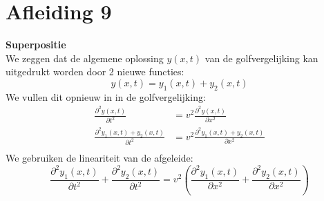 \documentclass[a4paper,kul]{kulakarticle} %
\begin{document}
\section{Afleiding 9}
\textbf{Superpositie}\\
We zeggen dat de algemene oplossing $y(x,t)$ van de golfvergelijking kan uitgedrukt worden door 2 nieuwe functies:
\begin{equation*}
	y(x,t) = y_1(x,t)+y_2(x,t)
\end{equation*}
We vullen dit opnieuw in in de golfvergelijking:
\begin{align*}
	\frac{\partial^2 y(x,t)}{\partial t^2} & = v^2 \frac{\partial^2 y(x,t)}{\partial x^2}\\
	\frac{\partial^2 y_1(x,t)+y_2(x,t)}{\partial t^2} & = v^2 \frac{\partial^2 y_1(x,t)+y_2(x,t)}{\partial x^2}\\
\end{align*}
We gebruiken de lineariteit van de afgeleide:
\begin{equation*}
	\frac{\partial^2 y_1(x,t)}{\partial t^2} +\frac{\partial^2 y_2(x,t)}{\partial t^2}  = v^2(\frac{\partial^2 y_1(x,t)}{\partial x^2}+\frac{\partial^2 y_2(x,t)}{\partial x^2})
\end{equation*}
\newpage
\end{document}
